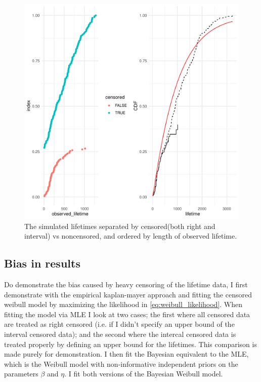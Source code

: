 \begin{figure}
    \centering
    \includegraphics[width=1\textwidth]{./figures/sim_data_desc.pdf}
    \caption{The simulated lifetimes separated by censored(both right and interval) vs noncensored, and ordered by length of observed lifetime.}
    \label{fig:sim_censored_units}
\end{figure}



\subsection{Bias in results}

Do demonstrate the bias caused by heavy censoring of the lifetime data, I first demonstrate with the empirical kaplan-mayer approach and fitting the censored weibull model by maximizing the likelihood in \ref{eq:weibull_likelihood}. When fitting the model via MLE I look at two cases; the first where all censored data are treated as right censored (i.e. if I didn't specify an upper bound of the interval censored data); and the second where the intercal censored data is treated properly by defining an upper bound for the lifetimes. This comparison is made purely for demonstration. I then fit the Bayesian equivalent to the MLE, which is the Weibull model with non-informative independent priors on the parameters $\beta$ and $\eta$. I fit both versions of the Bayesian Weibull model. 

